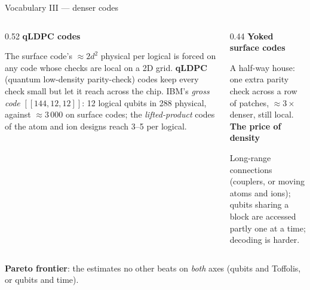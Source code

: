 \documentclass[aspectratio=169,11pt]{beamer}
\newcommand{\blocktitle}[1]{{\bfseries #1}\par\vskip1mm}
\begin{document}
\begin{frame}{Vocabulary III --- denser codes}
  \begin{columns}[T]
    \begin{column}{0.52\textwidth}
      \blocktitle{qLDPC codes}
      The surface code's $\approx2d^2$ physical per logical is forced on any code whose checks are local on a 2D grid. \textbf{qLDPC} (quantum low-density parity-check) codes keep every check small but let it reach across the chip. IBM's \emph{gross code} $[[144,12,12]]$: 12 logical qubits in 288 physical, against $\approx3\,000$ on surface codes; the \emph{lifted-product} codes of the atom and ion designs reach 3--5 per logical.
    \end{column}
    \begin{column}{0.44\textwidth}
      \blocktitle{Yoked surface codes}
      A half-way house: one extra parity check across a row of patches, $\approx3\times$ denser, still local.
      \vskip2mm
      \blocktitle{The price of density}
      Long-range connections (couplers, or moving atoms and ions); qubits sharing a block are accessed partly one at a time; decoding is harder.
    \end{column}
  \end{columns}
  \begin{takeaway}\textbf{Pareto frontier}: the estimates no other beats on \emph{both} axes (qubits and Toffolis, or qubits and time).\end{takeaway}
\end{frame}
\end{document}
